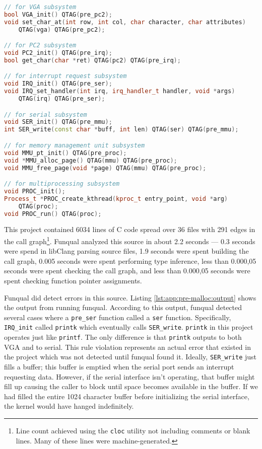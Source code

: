 \noindent\begin{minipage}[t]{\linewidth}
\begin{lstlisting}[language=c++,caption={Lines inserted into C source for a simple kernel in order to prevent subsystems from depending on interfaces not yet initialized.},label={lst:app:pre-malloc:annote}]
// for VGA subsystem
bool VGA_init() QTAG(pre_pc2);
void set_char_at(int row, int col, char character, char attributes)
    QTAG(vga) QTAG(pre_pc2);

// for PC2 subsystem
void PC2_init() QTAG(pre_irq);
bool get_char(char *ret) QTAG(pc2) QTAG(pre_irq);

// for interrupt request subsystem
void IRQ_init() QTAG(pre_ser);
void IRQ_set_handler(int irq, irq_handler_t handler, void *args)
    QTAG(irq) QTAG(pre_ser);

// for serial subsystem
void SER_init() QTAG(pre_mmu);
int SER_write(const char *buff, int len) QTAG(ser) QTAG(pre_mmu);

// for memory management unit subsystem
void MMU_pt_init() QTAG(pre_proc);
void *MMU_alloc_page() QTAG(mmu) QTAG(pre_proc);
void MMU_free_page(void *page) QTAG(mmu) QTAG(pre_proc);

// for multiprocessing subsystem
void PROC_init();
Process_t *PROC_create_kthread(kproc_t entry_point, void *arg)
    QTAG(proc);
void PROC_run() QTAG(proc);
\end{lstlisting}
\end{minipage}

This project contained 6034 lines of C code spread over 36 files with 291 edges in the call graph\footnote{Line count achieved using the \lstinline{cloc} utility not including comments or blank lines.  Many of these lines were machine-generated.}.  Funqual analyzed this source in about 2.2 seconds --- 0.3 seconds were spend in libClang parsing source files, 1.9 seconds were spent building the call graph, 0.005 seconds were spent performing type inference, less than 0.000,05 seconds were spent checking the call graph, and less than 0.000,05 seconds were spent checking function pointer assignments.  

Funqual did detect errors in this source.  Listing \ref{lst:app:pre-malloc:output} shows the output from running funqual.  According to this output, funqual detected several cases where a \lstinline{pre_ser} function called a \lstinline{ser} function.  Specifically, \lstinline{IRQ_init} called \lstinline{printk} which eventually calls \lstinline{SER_write}.  \lstinline{printk} in this project operates just like \lstinline{printf}.  The only difference is that \lstinline{printk} outputs to both VGA and to serial.  This rule violation represents an actual error that existed in the project which was not detected until funqual found it.  Ideally, \lstinline{SER_write} just fills a buffer; this buffer is emptied when the serial port sends an interrupt requesting data.  However, if the serial interface isn't operating, that buffer might fill up causing the caller to block until space becomes available in the buffer.  If we had filled the entire 1024 character buffer before initializing the serial interface, the kernel would have hanged indefinitely.

